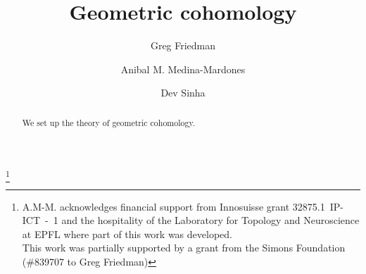 \documentclass{amsart}
\theoremstyle{definition}
\begin{document}


\title{Geometric cohomology}

\author[G. Friedman]{Greg Friedman}
\address{Department of Mathematics, Texas Christian University}

\author[A. Medina-Mardones]{Anibal M. Medina-Mardones}
\address{Max Planck Institute for Mathematics, Bonn, Germany}
\address{Department of Mathematics, University of Notre, Notre Dame, IN, USA}
\thanks{A.M-M. acknowledges financial support from Innosuisse grant \mbox{32875.1 IP-ICT - 1} and the hospitality of the Laboratory for Topology and Neuroscience at EPFL where part of this work was developed.\\This work was partially supported by a grant from the Simons Foundation (\#839707 to Greg Friedman) }

\author[D. Sinha]{Dev Sinha}
\address{Mathematics Department,
	University of Oregon}

\begin{abstract}
	We set up the theory of geometric cohomology.
\end{abstract}

\maketitle


\tableofcontents









\pagebreak
\end{document}
